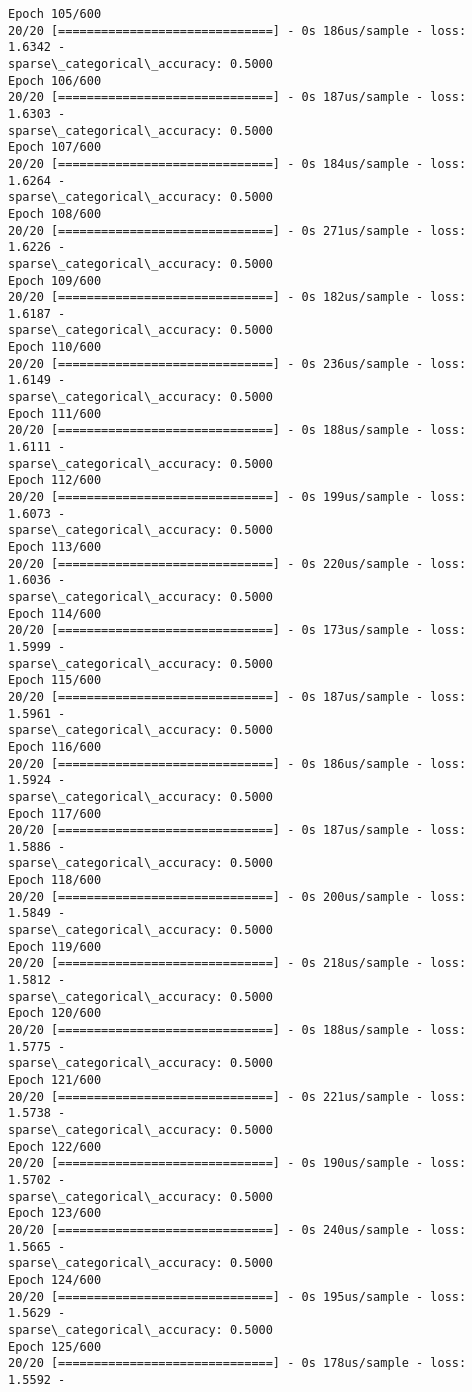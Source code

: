 \documentclass[11pt]{article}
\begin{document}
\begin{Verbatim}[commandchars=\\\{\}]
Epoch 105/600
20/20 [==============================] - 0s 186us/sample - loss: 1.6342 -
sparse\_categorical\_accuracy: 0.5000
Epoch 106/600
20/20 [==============================] - 0s 187us/sample - loss: 1.6303 -
sparse\_categorical\_accuracy: 0.5000
Epoch 107/600
20/20 [==============================] - 0s 184us/sample - loss: 1.6264 -
sparse\_categorical\_accuracy: 0.5000
Epoch 108/600
20/20 [==============================] - 0s 271us/sample - loss: 1.6226 -
sparse\_categorical\_accuracy: 0.5000
Epoch 109/600
20/20 [==============================] - 0s 182us/sample - loss: 1.6187 -
sparse\_categorical\_accuracy: 0.5000
Epoch 110/600
20/20 [==============================] - 0s 236us/sample - loss: 1.6149 -
sparse\_categorical\_accuracy: 0.5000
Epoch 111/600
20/20 [==============================] - 0s 188us/sample - loss: 1.6111 -
sparse\_categorical\_accuracy: 0.5000
Epoch 112/600
20/20 [==============================] - 0s 199us/sample - loss: 1.6073 -
sparse\_categorical\_accuracy: 0.5000
Epoch 113/600
20/20 [==============================] - 0s 220us/sample - loss: 1.6036 -
sparse\_categorical\_accuracy: 0.5000
Epoch 114/600
20/20 [==============================] - 0s 173us/sample - loss: 1.5999 -
sparse\_categorical\_accuracy: 0.5000
Epoch 115/600
20/20 [==============================] - 0s 187us/sample - loss: 1.5961 -
sparse\_categorical\_accuracy: 0.5000
Epoch 116/600
20/20 [==============================] - 0s 186us/sample - loss: 1.5924 -
sparse\_categorical\_accuracy: 0.5000
Epoch 117/600
20/20 [==============================] - 0s 187us/sample - loss: 1.5886 -
sparse\_categorical\_accuracy: 0.5000
Epoch 118/600
20/20 [==============================] - 0s 200us/sample - loss: 1.5849 -
sparse\_categorical\_accuracy: 0.5000
Epoch 119/600
20/20 [==============================] - 0s 218us/sample - loss: 1.5812 -
sparse\_categorical\_accuracy: 0.5000
Epoch 120/600
20/20 [==============================] - 0s 188us/sample - loss: 1.5775 -
sparse\_categorical\_accuracy: 0.5000
Epoch 121/600
20/20 [==============================] - 0s 221us/sample - loss: 1.5738 -
sparse\_categorical\_accuracy: 0.5000
Epoch 122/600
20/20 [==============================] - 0s 190us/sample - loss: 1.5702 -
sparse\_categorical\_accuracy: 0.5000
Epoch 123/600
20/20 [==============================] - 0s 240us/sample - loss: 1.5665 -
sparse\_categorical\_accuracy: 0.5000
Epoch 124/600
20/20 [==============================] - 0s 195us/sample - loss: 1.5629 -
sparse\_categorical\_accuracy: 0.5000
Epoch 125/600
20/20 [==============================] - 0s 178us/sample - loss: 1.5592 -

\end{Verbatim}
\end{document}
